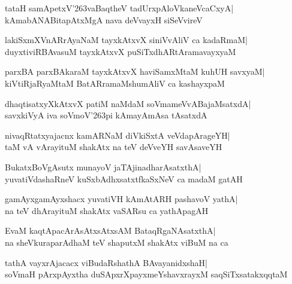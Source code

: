 \documentclass[twoside,12pt,openright]{book}
\def\S{\char'263}
\newcounter{shloka}[chapter]
\begin{document}
\begin{shloka}%
tataH samApetxV\S vaBaqtheV tadUrxpAloVkaneVcaCxyA|\\
kAmabANABitapAtxMgA nava deVvayxH siSeVvireV
\end{shloka}

\begin{shloka}%
lakiSxmXVnARrAyaNaM tayxkAtxvX siniVvAliV ca kadaRmaM|\\
duyxtiviRBAvasuM tayxkAtxvX puSiTxdhARtAramavayxyaM
\end{shloka}

\begin{shloka}%
parxBA parxBAkaraM tayxkAtxvX haviSamxMtaM kuhUH savxyaM|\\
kiVtiRjaRyaMtaM BatARramaMshumAliV ca kashayxpaM 
\end{shloka}

\begin{shloka}%
dhaqtisatxyXkAtxvX patiM naMdaM soVmameVvABajaMsatxdA|\\
savxkiVyA iva soVmoV\S pi kAmayAmAsa tAsatxdA
\end{shloka}

\begin{shloka}%
nivaqRtatxyajacnx kamARNaM diVkiSxtA veVdapArageYH|\\
taM vA vArayituM shakAtx na teV deVveYH savAsaveYH
\end{shloka}

\begin{shloka}%
BukatxBoVgAsutx munayoV jaTAjinadharAsatxthA|\\
yuvatiVdashaRneV kuSxbAdhxsatxtfkaSxNeV ca madaM gatAH
\end{shloka}

\begin{shloka}%
gamAyxgamAyxshacx yuvatiVH kAmAtARH pashavoV yathA|\\
na teV dhArayituM shakAtx vaSARsu ca yathApagAH
\end{shloka}

\begin{shloka}%
EvaM kaqtApacArAsAtxsAtxsAM BataqRgaNAsatxthA|\\
na sheVkuraparAdhaM teV shaputxM shakAtx viBuM na ca
\end{shloka}

\begin{shloka}%
tathA vayxrAjacacx viBudaRshathA BAvayanidxshaH|\\
soVmaH pArxpAyxtha duSApxrXpayxmeYshavxrayxM saqSiTxsatakxqqtaM 
\end{shloka}
\end{document}
